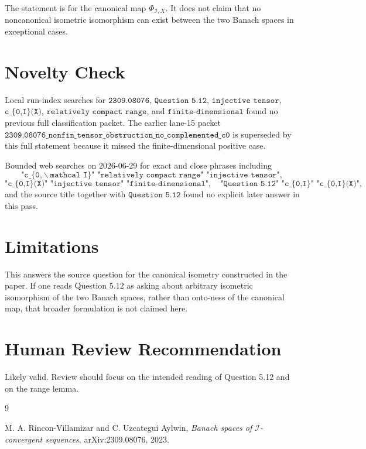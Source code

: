 \documentclass[11pt]{article}
\begin{document}
The statement is for the canonical map \(\Phi_{\mathcal I,X}\).  It does not
claim that no noncanonical isometric isomorphism can exist between the two
Banach spaces in exceptional cases.

\section*{Novelty Check}

Local run-index searches for \(\texttt{2309.08076}\),
\(\texttt{Question 5.12}\), \(\texttt{injective tensor}\),
\(\texttt{c\_\{0,I\}(X)}\), \(\texttt{relatively compact range}\), and
\(\texttt{finite-dimensional}\) found no previous full classification packet.
The earlier lane-15 packet
\(\texttt{2309.08076\_nonfin\_tensor\_obstruction\_no\_complemented\_c0}\)
is superseded by this full statement because it missed the finite-dimensional
positive case.

Bounded web searches on 2026-06-29 for exact and close phrases including
\[
\texttt{"c\_\{0,}\backslash\texttt{mathcal I\}" "relatively compact range"
"injective tensor"},
\]
\[
\texttt{"c\_\{0,I\}(X)" "injective tensor" "finite-dimensional"},
\quad
\texttt{"Question 5.12" "c\_\{0,I\}" "c\_\{0,I\}(X)"},
\]
and the source title together with \(\texttt{Question 5.12}\) found no explicit
later answer in this pass.

\section*{Limitations}

This answers the source question for the canonical isometry constructed in the
paper.  If one reads Question 5.12 as asking about arbitrary isometric
isomorphism of the two Banach spaces, rather than onto-ness of the canonical
map, that broader formulation is not claimed here.

\section*{Human Review Recommendation}

Likely valid.  Review should focus on the intended reading of Question 5.12
and on the range lemma.

\begin{thebibliography}{9}

M. A. Rincon-Villamizar and C. Uzcategui Aylwin,
\emph{Banach spaces of \(\mathcal I\)-convergent sequences},
arXiv:2309.08076, 2023.

\end{thebibliography}
\end{document}
